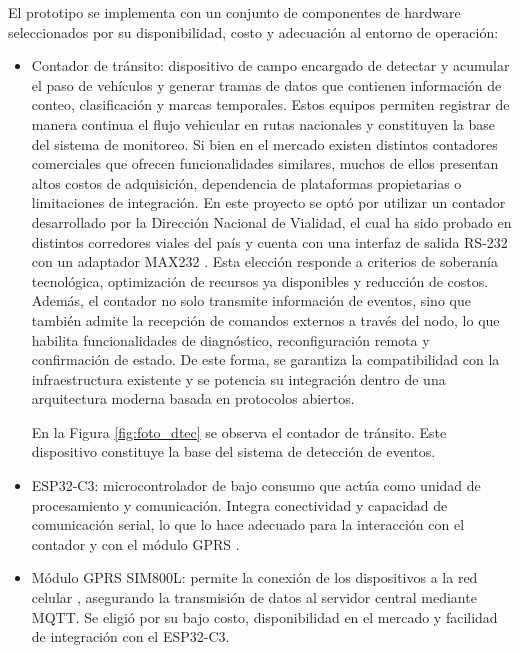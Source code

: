 El prototipo se implementa con un conjunto de componentes de hardware seleccionados por su disponibilidad, costo y adecuación al entorno de operación:

\begin{itemize}

\item  Contador de tránsito: dispositivo de campo encargado de detectar y acumular el paso de vehículos y generar tramas de datos que contienen información de conteo, clasificación y marcas temporales. Estos equipos permiten registrar de manera continua el flujo vehicular en rutas nacionales y constituyen la base del sistema de monitoreo. Si bien en el mercado existen distintos contadores comerciales que ofrecen funcionalidades similares, muchos de ellos presentan altos costos de adquisición, dependencia de plataformas propietarias o limitaciones de integración. En este proyecto se optó por utilizar un contador desarrollado por la Dirección Nacional de Vialidad, el cual ha sido probado en distintos corredores viales del país y cuenta con una interfaz de salida RS-232 \cite{tiRS232} con un adaptador MAX232 \cite{max232}. Esta elección responde a criterios de soberanía tecnológica, optimización de recursos ya disponibles y reducción de costos. Además, el contador no solo transmite información de eventos, sino que también admite la recepción de comandos externos a través del nodo, lo que habilita funcionalidades de diagnóstico, reconfiguración remota y confirmación de estado. De este forma, se garantiza la compatibilidad con la infraestructura existente y se potencia su integración dentro de una arquitectura moderna basada en protocolos abiertos.

En la Figura \ref{fig:foto_dtec} se observa el contador de tránsito. Este dispositivo constituye la base del sistema de detección de eventos. 




\item ESP32-C3: microcontrolador de bajo consumo que actúa como unidad de procesamiento y comunicación. Integra conectividad y capacidad de comunicación serial, lo que lo hace adecuado para la interacción con el contador y con el módulo GPRS \cite{esp32c3IDF}.

\item Módulo GPRS SIM800L: permite la conexión de los dispositivos a la red celular \cite{sim800l_datasheet} , asegurando la transmisión de datos al servidor central mediante MQTT. Se eligió por su bajo costo, disponibilidad en el mercado y facilidad de integración con el ESP32-C3.


\end{itemize}
